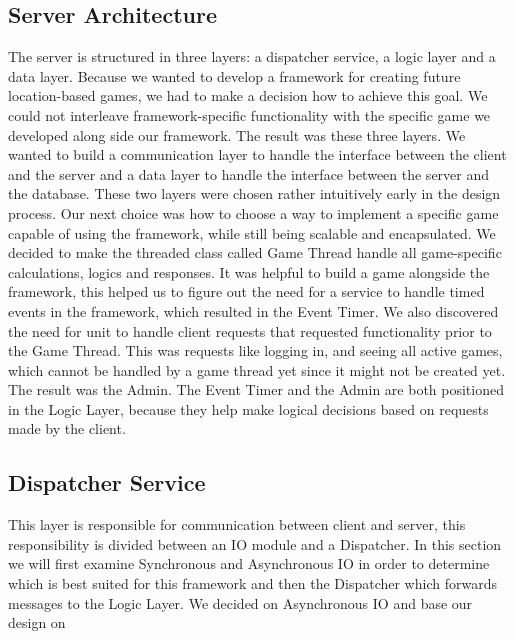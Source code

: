 \subsection{Server Architecture}
\label{sec:server}

The server is structured in three layers: a dispatcher service, a logic layer and a data layer. Because we wanted to develop a framework for creating future location-based games, we had to make a decision how to achieve this goal. We could not interleave framework-specific functionality with the specific game we developed along side our framework. The result was these three layers. We wanted to build a communication layer to handle the interface between the client and the server and a data layer to handle the interface between the server and the database. These two layers were chosen rather intuitively early in the design process. Our next choice was how to choose a way to implement a specific game capable of using the framework, while still being scalable and encapsulated. We decided to make the threaded class called Game Thread handle all game-specific calculations, logics and responses. 
It was helpful to build a game alongside the framework, this helped us to figure out the need for a service to handle timed events in the framework, which resulted in the Event Timer. We also discovered the need for unit to handle client requests that requested functionality prior to the Game Thread. This was requests like logging in, and seeing all active games, which cannot be handled by a game thread yet since it might not be created yet. The result was the Admin. The Event Timer and the Admin are both positioned in the Logic Layer, because they help make logical decisions based on requests made by the client. 



\subsection{Dispatcher Service}
This layer is responsible for communication between client and server, this responsibility is divided between an IO module and a Dispatcher. In this section we will first examine Synchronous and Asynchronous IO in order to determine which is best suited for this framework and then the Dispatcher which forwards messages to the Logic Layer. We decided on Asynchronous IO and base our design on \cite{?} 	 %

